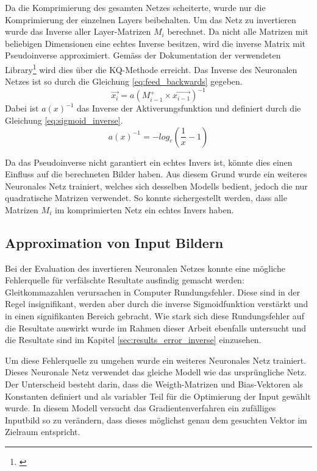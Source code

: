 \documentclass[Interploate_hadwritten_Digits.tex]{subfiles}
\begin{document}
	Da die Komprimierung des gesamten Netzes scheiterte, wurde nur die Komprimierung der einzelnen Layers beibehalten. Um das Netz zu invertieren wurde das Inverse aller Layer-Matrizen $ M_{i} $ berechnet. Da nicht alle Matrizen mit beliebigen Dimensionen eine echtes Inverse besitzen, wird die inverse Matrix mit Pseudoinverse approximiert. Gemäss der Dokumentation der verwendeten Library\footnote{\cite{numpy}} wird dies über die KQ-Methode erreicht. Das Inverse des Neuronalen Netzes ist so durch die Gleichung \ref{eq:feed_backwards} gegeben.
	\begin{equation}
		\vec{x_{i}} = a(M_{i-1}^{+} \times \vec{x_{i-1}})^{-1}
		\label{eq:feed_backwards}
	\end{equation}
	Dabei ist $ a(x)^{-1} $ das Inverse der Aktiverungsfunktion und definiert durch die Gleichung \ref{eq:sigmoid_inverse}.
	\begin{equation}
		a(x)^{-1} = -log_{e}(\frac{1}{x} - 1)
		\label{eq:sigmoid_inverse}
	\end{equation}
	
	Da das Pseudoinverse nicht garantiert ein echtes Invers ist, könnte dies einen Einfluss auf die berechneten Bilder haben. Aus diesem Grund wurde ein weiteres Neuronales Netz trainiert, welches sich desselben Modells bedient, jedoch die nur quadratische Matrizen verwendet. So konnte sichergestellt werden, dass alle Matrizen $ M_{i} $ im komprimierten Netz ein echtes Invers haben.
	
	\subsection{Approximation von Input Bildern}
	Bei der Evaluation des invertieren Neuronalen Netzes konnte eine mögliche Fehlerquelle für verfälschte Resultate ausfindig gemacht werden: Gleitkommazahlen verursachen in Computer Rundungsfehler. Diese sind in der Regel insignifikant, werden aber durch die inverse Sigmoidfunktion verstärkt und in einen signifikanten Bereich gebracht. Wie stark sich diese Rundungsfehler auf die Resultate auswirkt wurde im Rahmen dieser Arbeit ebenfalls untersucht und die Resultate sind im Kapitel \ref{sec:results_error_inverse} einzusehen.
	
	Um diese Fehlerquelle zu umgehen wurde ein weiteres Neuronales Netz trainiert. Dieses Neuronale Netz verwendet das gleiche Modell wie das ursprüngliche Netz. Der Unterscheid besteht darin, dass die Weigth-Matrizen und Bias-Vektoren als Konstanten definiert und als variabler Teil für die Optimierung der Input gewählt wurde. In diesem Modell versucht das Gradientenverfahren ein zufälliges Inputbild so zu verändern, dass dieses möglichst genau dem gesuchten Vektor im Zielraum entspricht.
\end{document}
